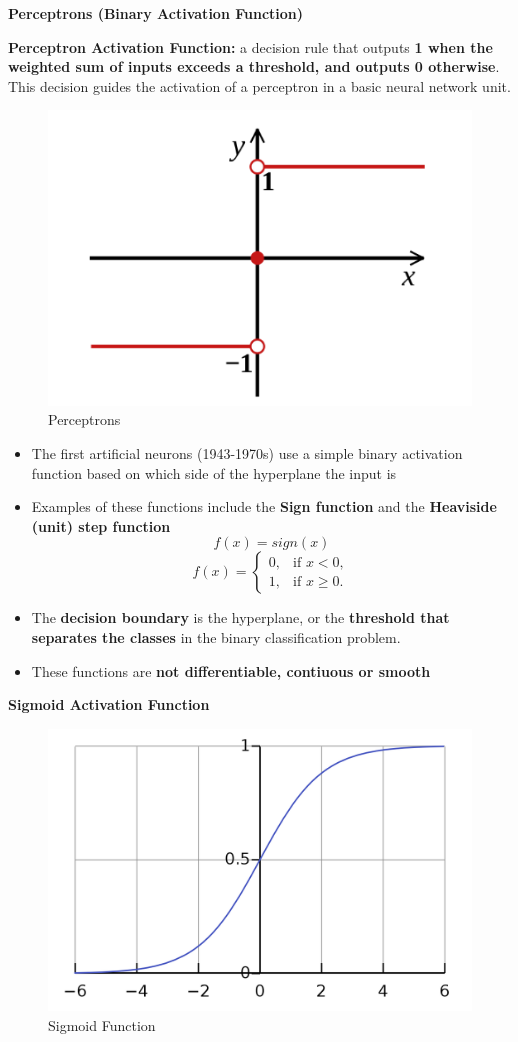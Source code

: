 \textbf{Perceptrons (Binary Activation Function)}
\begin{definition}
   \textbf{ Perceptron Activation Function:} a decision rule that outputs \textbf{1 when the weighted sum of inputs exceeds a threshold, and outputs 0 otherwise}. This decision guides the activation of a perceptron in a basic neural network unit.
\end{definition}
\begin{figure}[h!t]
    \centering
    \includegraphics[width=0.4\linewidth]{perceptrons.png}
    \caption{Perceptrons}
    \label{fig:enter-label}
\end{figure}
\begin{itemize}
\item The first artificial neurons (1943-1970s) use a simple binary activation function based on which side of the hyperplane the input is
\item Examples of these functions include the \textbf{Sign function} and the \textbf{Heaviside (unit) step function}
\[f(x) = sign(x)\]
\[f(x) = \begin{cases}
        0, & \text{if } x < 0, \\
        1, & \text{if } x \geq 0.
      \end{cases}\]
      \item The \textbf{decision boundary} is the hyperplane, or the \textbf{threshold that separates the classes} in the binary classification problem. 
      \item These functions are \textbf{not differentiable, contiuous or smooth}


\end{itemize}
\textbf{Sigmoid Activation Function}
\begin{figure}[h!t]
    \centering
    \includegraphics[width=0.5\linewidth]{sigmoid.png}
    \caption{Sigmoid Function}
    \label{fig:enter-label}
\end{figure}
